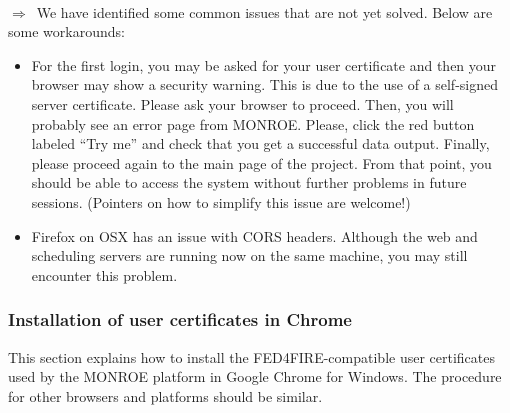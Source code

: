 \documentclass[a4paper,10pt]{article}
\newcommand{\monroe}{MONROE}
\begin{document}
~\\$\Rightarrow$~We have identified some common issues that are not yet solved. Below are some workarounds:
\begin{itemize}
	\item For the first login, you may be asked for your user certificate and then your browser may show a security warning. This is due to the use of a self-signed server certificate. Please ask your browser to proceed. Then, you will probably see an error page from \monroe{}. Please, click the red button labeled ``Try me'' and check that you get a successful data output. Finally, please proceed again to the main page of the project. From that point, you should be able to access the system without further problems in future sessions. (Pointers on how to simplify this issue are welcome!)
	\item Firefox on OSX has an issue with CORS headers. Although the web and scheduling servers are running now on the same machine, you may still encounter this problem.
\end{itemize}

\subsubsection{Installation of user certificates in Chrome}
\label{subsec:userCertsInstallWinChrome}

This section explains how to install the FED4FIRE-compatible user certificates used by the \monroe{} platform in Google Chrome for Windows.
The procedure for other browsers and platforms should be similar.
\end{document}

